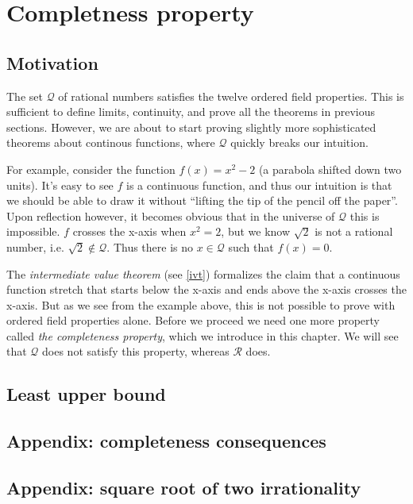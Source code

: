 \section{Completness property}

\subsection{Motivation}
The set $\mathcal{Q}$ of rational numbers satisfies the twelve ordered field
properties. This is sufficient to define limits, continuity, and prove
all the theorems in previous sections. However, we are about to start
proving slightly more sophisticated theorems about continous
functions, where $\mathcal{Q}$ quickly breaks our intuition.

\vs

For example, consider the function $f(x)=x^{2}-2$ (a parabola shifted
down two units). It's easy to see $f$ is a continuous function, and
thus our intuition is that we should be able to draw it without
``lifting the tip of the pencil off the paper''. Upon reflection
however, it becomes obvious that in the universe of $\mathcal{Q}$ this is
impossible. $f$ crosses the x-axis when $x^{2}=2$, but we know
$\sqrt{2}$ is not a rational number, i.e. $\sqrt{2}\notin\mathcal{Q}$. Thus there is
no $x\in\mathcal{Q}$ such that $f(x)=0$.

\vs

The \textit{intermediate value theorem} (see \ref{ivt}) formalizes the
claim that a continuous function stretch that starts below the x-axis
and ends above the x-axis crosses the x-axis. But as we see from the
example above, this is not possible to prove with ordered field
properties alone. Before we proceed we need one more property called
\textit{the completeness property}, which we introduce in this
chapter. We will see that $\mathcal{Q}$ does not satisfy this property, whereas
$\mathcal{R}$ does.



\subsection{Least upper bound}
\subsection{Appendix: completeness consequences}
\subsection{Appendix: square root of two irrationality}


